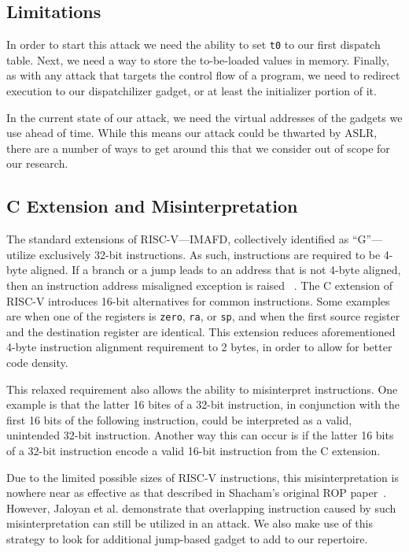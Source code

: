 
\subsection{Limitations}

In order to start this attack we need the ability to set \verb|t0| to our first
dispatch table. Next, we need a way to store the to-be-loaded values in memory.
Finally, as with any attack that targets the control flow of a program, we need
to redirect execution to our dispatchilizer gadget, or at least the initializer
portion of it.

In the current state of our attack, we need the virtual addresses of the
gadgets we use ahead of time. While this means our attack could be thwarted by
ASLR, there are a number of ways to get around this that we consider out of
scope for our research.

\subsection{C Extension and Misinterpretation}

The standard extensions of RISC-V---IMAFD, collectively identified as ``G''---%
utilize exclusively 32-bit instructions. As such, instructions are required to
be 4-byte aligned. If a branch or a jump leads to an address that is not 4-byte
aligned, then an instruction address misaligned exception is raised~%
\cite{riscvmanual}. The C extension of RISC-V introduces 16-bit alternatives for
common instructions. Some examples are when one of the registers is \verb|zero|,
\verb|ra|, or \verb|sp|, and when the first source register and the destination
register are identical. This extension reduces aforementioned 4-byte instruction
alignment requirement to 2 bytes, in order to allow for better code density.

This relaxed requirement also allows the ability to misinterpret instructions.
One example is that the latter 16 bites of a 32-bit instruction, in conjunction
with the first 16 bits of the following instruction, could be interpreted as
a valid, unintended 32-bit instruction. Another way this can occur is if the
latter 16 bits of a 32-bit instruction encode a valid 16-bit instruction from
the C extension.

Due to the limited possible sizes of RISC-V instructions, this misinterpretation
is nowhere near as effective as that described in Shacham's original ROP
paper~\cite{shacham07ropx86}. However, Jaloyan et al. demonstrate that overlapping
instruction caused by such misinterpretation can still be utilized in an
attack\cite{jaloyan20ropriscv}. We also make use of this strategy to look for
additional jump-based gadget to add to our repertoire.

